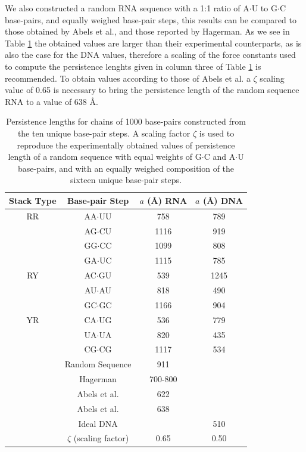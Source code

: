 We  also  constructed  a random  RNA  sequence  with  a 1:1  ratio  of
A$\cdot$U  to  G$\cdot$C  base-pairs,  and equally  weighed  base-pair
steps, this results can be compared to those obtained by Abels et al.,
and those reported  by Hagerman. As we see  in Table \ref{tab:compare}
the obtained  values are larger than  their experimental counterparts,
as is  also the case  for the DNA  values, therefore a scaling  of the
force  constants used  to compute the  persistence  lenghts given  in
column  three of  Table  \ref{tab:compare} is  recommended. To  obtain
values according to  those of Abels et al. a  $\zeta$ scaling value of
0.65  is necessary  to  bring  the persistence  length  of the  random
sequence RNA to a value of 638 \AA.

\begin{table}  
\begin{center}
\begin{tabular}{|c|c|c|c|}
\hline
Stack Type & Base-pair Step & $a$ (\AA) RNA & $a$ (\AA) DNA\\
\hline \hline
RR &  AA$\cdot$UU & 758      &  789   \\
   &  AG$\cdot$CU & 1116     &  919   \\
   &  GG$\cdot$CC & 1099     &  808   \\
   &  GA$\cdot$UC & 1115     &  785   \\
\hline
RY &  AC$\cdot$GU & 539      &  1245   \\
   &  AU$\cdot$AU & 818      &  490   \\
   &  GC$\cdot$GC & 1166     &  904   \\
\hline
YR &  CA$\cdot$UG & 536      &  779   \\
   &  UA$\cdot$UA & 820      &  435   \\
   &  CG$\cdot$CG & 1117     &  534   \\
\hline
   & Random Sequence  & 911   &        \\
   & Hagerman   & 700-800    &        \\
   & Abels et al.   & 622    &        \\ 
   & Abels et al.   & 638    &        \\
   & Ideal DNA    &          & 510    \\
   & $\zeta$ (scaling factor)  & 0.65 & 0.50 \\
\hline
\end{tabular}
\caption{Persistence lengths for chains of 1000 base-pairs constructed
  from the ten unique base-pair steps. A scaling factor $\zeta$ is used to
  reproduce the experimentally obtained values of persistence length
  of a random sequence with equal weights of G$\cdot$C and A$\cdot$U
  base-pairs, and with an equally weighed composition of the sixteen
  unique base-pair steps.}
\label{tab:compare}
\end{center}
\end{table}

